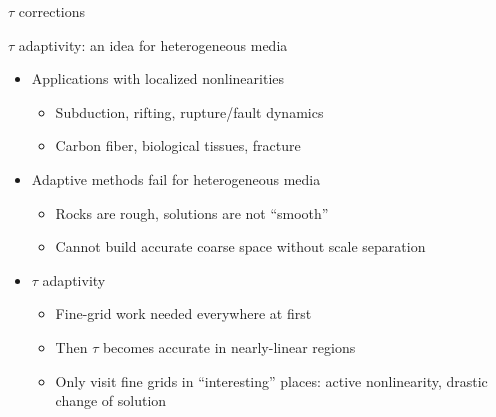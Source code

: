 \documentclass{beamer}
\begin{document}
\begin{frame}{$\tau$ corrections}
\begin{figure}
\end{figure}
\end{frame}

\begin{frame}{$\tau$ adaptivity: an idea for heterogeneous media}
  \begin{itemize}
  \item Applications with localized nonlinearities
    \begin{itemize}
    \item Subduction, rifting, rupture/fault dynamics
    \item Carbon fiber, biological tissues, fracture
    \end{itemize}
  \item Adaptive methods fail for heterogeneous media
    \begin{itemize}
    \item Rocks are rough, solutions are not ``smooth''
    \item Cannot build accurate coarse space without scale separation
    \end{itemize}
  \item $\tau$ adaptivity
    \begin{itemize}
    \item Fine-grid work needed everywhere at first
    \item Then $\tau$ becomes accurate in nearly-linear regions
    \item Only visit fine grids in ``interesting'' places: active nonlinearity, drastic change of solution
    \end{itemize}
  \end{itemize}
\end{frame}
\end{document}
